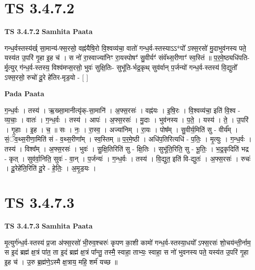 \documentclass[17pt]{extarticle}
\begin{document}

\section{ TS 3.4.7.2 }

\textbf{TS 3.4.7.2 } \newline
\textbf{Samhita Paata} \newline

गन्ध॒र्वस्तस्य॑र्ख् सा॒मान्य॑-फ्स॒रसो॒ वह्न॑यैषि॒रो वि॒श्वव्य॑चा॒ वातो॑ गन्ध॒र्व-स्तस्याऽऽ*पो᳚ ऽफ्स॒रसो॑ मु॒दाभुव॑नस्य पते॒ यस्य॑त उ॒परि॑ गृ॒हा इ॒ह च॑ । स नो॑ रा॒स्वाज्या॑निꣳ रा॒यस्पोषꣳ॑ सु॒वीर्यꣳ॑ संवॅथ्स॒रीणाꣳ॑ स्व॒स्तिं ॥ प॒र॒मे॒ष्ठ्यधि॑पति-र्मृ॒त्युर् ग॑न्ध॒र्व-स्तस्य॒ विश्व॑मप्स॒रसो॒ भुवः॑ सुक्षि॒तिः- सुभू॑ति-र्भद्र॒कृथ् सुव॑र्वान् प॒र्जन्यो॑ गन्ध॒र्व-स्तस्य॑ वि॒द्युतो᳚ ऽफ्स॒रसो॒ रुचो॑ दू॒रे हे॑तिर-मृड॒यो - [  ] \newline

\textbf{Pada Paata} \newline

ग॒न्ध॒र्वः । तस्य॑ । ऋ॒ख्सा॒मानीत्यृ॑क्-सा॒मानि॑ । अ॒फ्स॒रसः॑ । वह्न॑यः । इ॒षि॒रः । वि॒श्वव्य॑चा॒ इति॑ वि॒श्व - व्य॒चाः॒ । वातः॑ । ग॒न्ध॒र्वः । तस्य॑ । आपः॑ । अ॒फ्स॒रसः॑ । मु॒दाः । भुव॑नस्य । प॒ते॒ । यस्य॑ । ते॒ । उ॒परि॑ । गृ॒हाः । इ॒ह । च॒ ॥ सः । नः॒ । रा॒स्व॒ । अज्या॑निम् । रा॒यः । पोष᳚म् । सु॒वीर्य॒मिति॑ सु - वीर्य᳚म् । सं॒ॅव॒थ्स॒रीणा॒मिति॑ सं - व॒थ्स॒रीणा᳚म् । स्व॒स्तिम् ॥ प॒र॒मे॒ष्ठी । अधि॑प॒तिरित्यधि॑ - प॒तिः॒ । मृ॒त्युः । ग॒न्ध॒र्वः । तस्य॑ । विश्व᳚म् । अ॒फ्स॒रसः॑ । भुवः॑ । सु॒क्षि॒तिरिति॑ सु - क्षि॒तिः । सुभू॑ति॒रिति॒ सु - भू॒तिः॒ । भ॒द्र॒कृदिति॑ भद्र - कृत् । सुव॑र्वा॒निति॒ सुवः॑ - वा॒न् । प॒र्जन्यः॑ । ग॒न्ध॒र्वः । तस्य॑ । वि॒द्युत॒ इति॑ वि-द्युतः॑ । अ॒फ्स॒रसः॑ । रुचः॑ । दू॒रेहे॑ति॒रिति॑ दू॒रे - हे॒तिः॒ । अ॒मृ॒ड॒यः ।  \newline





\section{ TS 3.4.7.3 }

\textbf{TS 3.4.7.3 } \newline
\textbf{Samhita Paata} \newline

मृ॒त्युर्ग॑न्ध॒र्व-स्तस्य॑ प्र॒जा अ॑फ्स॒रसो॑ भी॒रुव॒श्चरुः॑ कृपण का॒शी कामो॑ गन्ध॒र्व-स्तस्या॒धयो᳚ ऽफ्स॒रसः॑ शो॒चय॑न्ती॒र्नाम॒ स इ॒दं ब्रह्म॑ क्ष॒त्रं पा॑त॒ ता इ॒दं ब्रह्म॑ क्ष॒त्रं पा᳚न्तु॒ तस्मै॒ स्वाहा॒ ताभ्यः॒ स्वाहा॒ स नो॑ भुवनस्य पते॒ यस्य॑त उ॒परि॑ गृ॒हा इ॒ह च॑ । उ॒रु ब्र॒ह्म॑णे॒ऽस्मै क्ष॒त्राय॒ महि॒ शर्म॑ यच्छ ॥ \newline
\end{document}

